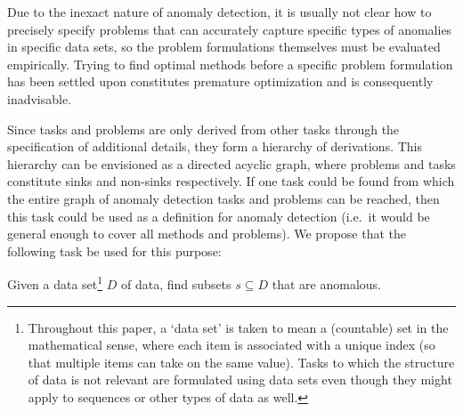 Due to the inexact nature of anomaly detection, it is usually not clear how to precisely specify problems that can accurately capture specific types of anomalies in specific data sets, so the problem formulations themselves must be evaluated empirically. Trying to find optimal methods before a specific problem formulation has been settled upon constitutes premature optimization and is consequently inadvisable.

Since tasks and problems are only derived from other tasks through the specification of additional details, they form a hierarchy of derivations. This hierarchy can be envisioned as a directed acyclic graph, where problems and tasks constitute sinks and non-sinks respectively. If one task could be found from which the entire graph of anomaly detection tasks and problems can be reached, then this task could be used as a definition for anomaly detection (i.e.\ it would be general enough to cover all methods and problems). We propose that the following task be used for this purpose:

\begin{task}
\label{task:anomaly_detection}
  Given a data set\footnote{Throughout this paper, a `data set' is taken to mean a (countable) set in the mathematical sense, where each item is associated with a unique index (so that multiple items can take on the same value). Tasks to which the structure of data is not relevant are formulated using data sets even though they might apply to sequences or other types of data as well.} $D$ of data, find subsets $s \subseteq D$ that are anomalous.
\end{task}

